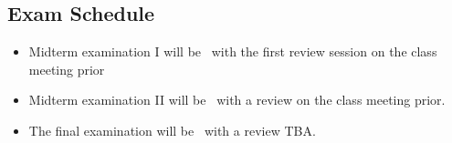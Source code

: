 
\subsection*{Exam Schedule}\label{subsec:exam_schedule}

\begin{itemize}
\itemsep -0.0em 
\item Midterm examination I will be \midtermonedateandlocation~with the first review session on the class meeting prior
\item Midterm examination II will be \midtermtwodateandlocation~with a review on the class meeting prior.
\item The final examination will be \finaldateandlocation~with a review TBA.
\end{itemize}